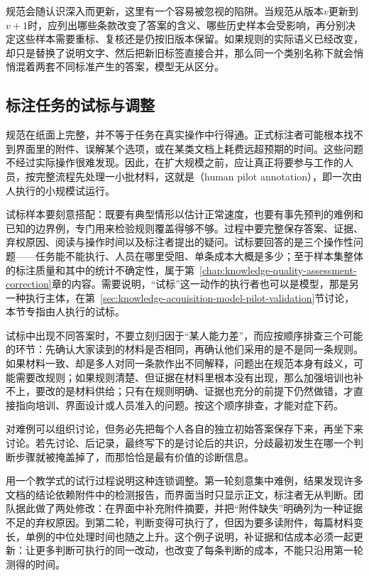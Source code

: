 规范会随认识深入而更新，这里有一个容易被忽视的陷阱。当规范从版本$v$更新到$v+1$时，应列出哪些条款改变了答案的含义、哪些历史样本会受影响，再分别决定这些样本需要重标、复核还是仍按旧版本保留。如果规则的实际语义已经改变，却只是替换了说明文字、然后把新旧标签直接合并，那么同一个类别名称下就会悄悄混着两套不同标准产生的答案，模型无从区分。

\subsection{标注任务的试标与调整}
\label{sec:knowledge-acquisition-human-pilot}

规范在纸面上完整，并不等于任务在真实操作中行得通。正式标注者可能根本找不到界面里的附件、误解某个选项，或在某类文档上耗费远超预期的时间。这些问题不经过实际操作很难发现。因此，在扩大规模之前，应让真正将要参与工作的人员，按完整流程先处理一小批材料，这就是（human pilot annotation），即一次由人执行的小规模试运行。

试标样本要刻意搭配：既要有典型情形以估计正常速度，也要有事先预判的难例和已知的边界例，专门用来检验规则覆盖得够不够。过程中要完整保存答案、证据、弃权原因、阅读与操作时间以及标注者提出的疑问。试标要回答的是三个操作性问题——任务能不能执行、人员在哪里受阻、单条成本大概是多少；至于样本集整体的标注质量和其中的统计不确定性，属于第~\ref{chap:knowledge-quality-assessment-correction}章的内容。需要说明，“试标”这一动作的执行者也可以是模型，那是另一种执行主体，在第~\ref{sec:knowledge-acquisition-model-pilot-validation}节讨论，本节专指由人执行的试标。

试标中出现不同答案时，不要立刻归因于“某人能力差”，而应按顺序排查三个可能的环节：先确认大家读到的材料是否相同，再确认他们采用的是不是同一条规则。如果材料一致、却是多人对同一条款作出不同解释，问题出在规范本身有歧义，可能需要改规则；如果规则清楚、但证据在材料里根本没有出现，那么加强培训也补不上，要改的是材料供给；只有在规则明确、证据也充分的前提下仍然做错，才直接指向培训、界面设计或人员准入的问题。按这个顺序排查，才能对症下药。

对难例可以组织讨论，但务必先把每个人各自的独立初始答案保存下来，再坐下来讨论。若先讨论、后记录，最终写下的是讨论后的共识，分歧最初发生在哪一个判断步骤就被掩盖掉了，而那恰恰是最有价值的诊断信息。

用一个教学式的试行过程说明这种连锁调整。第一轮刻意集中难例，结果发现许多文档的结论依赖附件中的检测报告，而界面当时只显示正文，标注者无从判断。团队据此做了两处修改：在界面中补充附件摘要，并把“附件缺失”明确列为一种证据不足的弃权原因。到第二轮，判断变得可执行了，但因为要多读附件，每篇材料变长，单例的中位处理时间也随之上升。这个例子说明，补证据和估成本必须一起更新：让更多判断可执行的同一改动，也改变了每条判断的成本，不能只沿用第一轮测得的时间。

